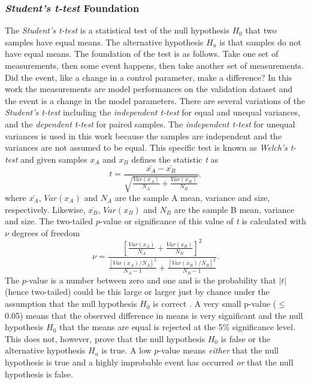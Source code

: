 \subsubsection{\textit{Student's t-test} Foundation}
\label{sec:students_t-test}
The \textit{Student's t-test} is a statistical test of the null hypothesis $H_{0}$ that two samples have equal means. The alternative hypothesis $H_{a}$ is that samples do not have equal means. The foundation of the test is as follows. Take one set of measurements, then some event happens, then take another set of measurements. Did the event, like a change in a control parameter, make a difference? In this work the measurements are model performances on the validation dataset and the event is a change in the model parameters. There are several variations of the \textit{Student's t-test} including the \textit{independent t-test} for equal and unequal variances, and the \textit{dependent t-test} for paired samples. The \textit{independent t-test} for unequal variances is used in this work because the samples are independent and the variances are not assumed to be equal. This specific test is known as \textit{Welch's t-test} and given samples $x_{A}$ and $x_{B}$ defines the statistic \textit{t} as
\begin{equation}
	t = \frac{\bar{x_{A}} - \bar{x_{B}}}{\sqrt{\frac{Var(x_{A})}{N_{A}} + \frac{Var(x_{B})}{N_{B}}}},
\end{equation}
where $\bar{x_{A}}$, $Var(x_{A})$ and $N_{A}$ are the sample A mean, variance and size, respectively. Likewise, $\bar{x_{B}}$, $Var(x_{B})$ and $N_{B}$ are the sample B mean, variance and size. The two-tailed $p$-value or significance of this value of \textit{t} is calculated with $\nu$ degrees of freedom
\begin{equation}
	\nu = \frac{\left[\frac{Var(x_{A})}{N_{A}} + \frac{Var(x_{B})}{N_{B}}\right]^{2}}{\frac{\left[Var(x_{A})/N_{A}\right]^{2}}{N_{A} - 1} + \frac{\left[Var(x_{B})/N_{B}\right]^{2}}{N_{B} - 1}}.
\end{equation}
The $p$-value is a number between zero and one and is the probability that $|t|$ (hence two-tailed) could be this large or larger just by chance under the assumption that the null hypothesis $H_{0}$ is correct \cite{10.5555/1403886}. A very small p-value ($\le$ 0.05) means that the observed difference in means is very significant and the null hypothesis $H_{0}$ that the means are equal is rejected at the 5\% significance level. This does not, however, prove that the null hypothesis $H_{0}$ is false or the alternative hypothesis $H_{a}$ is true. A low $p$-value means \textit{either} that the null hypothesis is true and a highly improbable event has occurred \textit{or} that the null hypothesis is false.

